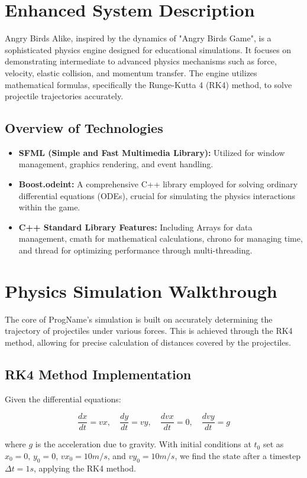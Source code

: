 \documentclass[12pt]{article}
\begin{document}
\RaggedRight
\section{Enhanced System Description}
Angry Birds Alike, inspired by the dynamics of "Angry Birds Game", is a sophisticated physics engine designed for educational simulations. It focuses on demonstrating intermediate to advanced physics mechanisms such as force, velocity, elastic collision, and momentum transfer. The engine utilizes mathematical formulas, specifically the Runge-Kutta 4 (RK4) method, to solve projectile trajectories accurately.

\subsection{Overview of Technologies}
\begin{itemize}
    \item \textbf{SFML (Simple and Fast Multimedia Library):} Utilized for window management, graphics rendering, and event handling.
    \item \textbf{Boost.odeint:} A comprehensive C++ library employed for solving ordinary differential equations (ODEs), crucial for simulating the physics interactions within the game.
    \item \textbf{C++ Standard Library Features:} Including Arrays for data management, cmath for mathematical calculations, chrono for managing time, and thread for optimizing performance through multi-threading.
\end{itemize}

\section{Physics Simulation Walkthrough}
The core of ProgName's simulation is built on accurately determining the trajectory of projectiles under various forces. This is achieved through the RK4 method, allowing for precise calculation of distances covered by the projectiles.

\subsection{RK4 Method Implementation}
Given the differential equations:

\[
\frac{dx}{dt} = vx, \quad \frac{dy}{dt} = vy, \quad \frac{dvx}{dt} = 0, \quad \frac{dvy}{dt} = g
\]

where \(g\) is the acceleration due to gravity. With initial conditions at \(t_0\) set as \(x_0 = 0\), \(y_0 = 0\), \(vx_0 = 10m/s\), and \(vy_0 = 10m/s\), we find the state after a timestep \(\Delta t = 1s\), applying the RK4 method.
\end{document}

